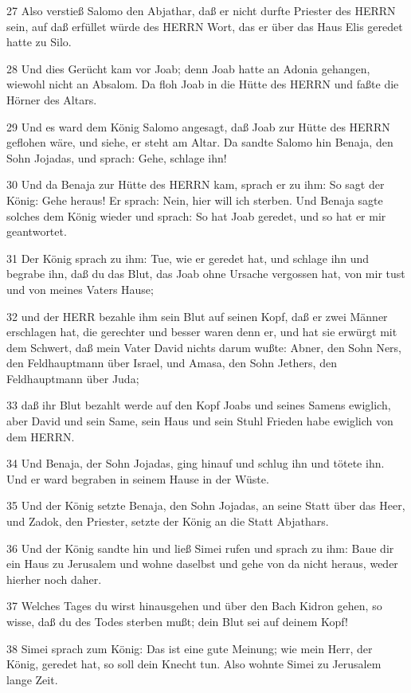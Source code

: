 \par 27 Also verstieß Salomo den Abjathar, daß er nicht durfte Priester des HERRN sein, auf daß erfüllet würde des HERRN Wort, das er über das Haus Elis geredet hatte zu Silo.
\par 28 Und dies Gerücht kam vor Joab; denn Joab hatte an Adonia gehangen, wiewohl nicht an Absalom. Da floh Joab in die Hütte des HERRN und faßte die Hörner des Altars.
\par 29 Und es ward dem König Salomo angesagt, daß Joab zur Hütte des HERRN geflohen wäre, und siehe, er steht am Altar. Da sandte Salomo hin Benaja, den Sohn Jojadas, und sprach: Gehe, schlage ihn!
\par 30 Und da Benaja zur Hütte des HERRN kam, sprach er zu ihm: So sagt der König: Gehe heraus! Er sprach: Nein, hier will ich sterben. Und Benaja sagte solches dem König wieder und sprach: So hat Joab geredet, und so hat er mir geantwortet.
\par 31 Der König sprach zu ihm: Tue, wie er geredet hat, und schlage ihn und begrabe ihn, daß du das Blut, das Joab ohne Ursache vergossen hat, von mir tust und von meines Vaters Hause;
\par 32 und der HERR bezahle ihm sein Blut auf seinen Kopf, daß er zwei Männer erschlagen hat, die gerechter und besser waren denn er, und hat sie erwürgt mit dem Schwert, daß mein Vater David nichts darum wußte: Abner, den Sohn Ners, den Feldhauptmann über Israel, und Amasa, den Sohn Jethers, den Feldhauptmann über Juda;
\par 33 daß ihr Blut bezahlt werde auf den Kopf Joabs und seines Samens ewiglich, aber David und sein Same, sein Haus und sein Stuhl Frieden habe ewiglich von dem HERRN.
\par 34 Und Benaja, der Sohn Jojadas, ging hinauf und schlug ihn und tötete ihn. Und er ward begraben in seinem Hause in der Wüste.
\par 35 Und der König setzte Benaja, den Sohn Jojadas, an seine Statt über das Heer, und Zadok, den Priester, setzte der König an die Statt Abjathars.
\par 36 Und der König sandte hin und ließ Simei rufen und sprach zu ihm: Baue dir ein Haus zu Jerusalem und wohne daselbst und gehe von da nicht heraus, weder hierher noch daher.
\par 37 Welches Tages du wirst hinausgehen und über den Bach Kidron gehen, so wisse, daß du des Todes sterben mußt; dein Blut sei auf deinem Kopf!
\par 38 Simei sprach zum König: Das ist eine gute Meinung; wie mein Herr, der König, geredet hat, so soll dein Knecht tun. Also wohnte Simei zu Jerusalem lange Zeit.
